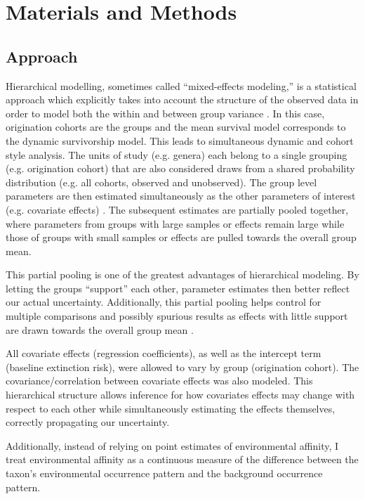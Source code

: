 \documentclass[12pt,letterpaper]{article}
\begin{document}
\section{Materials and Methods}

\subsection{Approach}

Hierarchical modelling, sometimes called ``mixed-effects modeling,'' is a statistical approach which explicitly takes into account the structure of the observed data in order to model both the within and between group variance \citep{Gelman2013d,Gelman2007}. In this case, origination cohorts are the groups and the mean survival model corresponds to the dynamic survivorship model. This leads to simultaneous dynamic and cohort style analysis. The units of study (e.g. genera) each belong to a single grouping (e.g. origination cohort) that are also considered draws from a shared probability distribution (e.g. all cohorts, observed and unobserved). The group level parameters are then estimated simultaneously as the other parameters of interest (e.g. covariate effects) \citep{Gelman2013d}. The subsequent estimates are partially pooled together, where parameters from groups with large samples or effects remain large while those of groups with small samples or effects are pulled towards the overall group mean. 

This partial pooling is one of the greatest advantages of hierarchical modeling. By letting the groups ``support'' each other, parameter estimates then better reflect our actual uncertainty. Additionally, this partial pooling helps control for multiple comparisons and possibly spurious results as effects with little support are drawn towards the overall group mean \citep{Gelman2013d,Gelman2007}. 

All covariate effects (regression coefficients), as well as the intercept term (baseline extinction risk), were allowed to vary by group (origination cohort). The covariance/correlation between covariate effects was also modeled. This hierarchical structure allows inference for how covariates effects may change with respect to each other while simultaneously estimating the effects themselves, correctly propagating our uncertainty. 

Additionally, instead of relying on point estimates of environmental affinity, I treat environmental affinity as a continuous measure of the difference between the taxon's environmental occurrence pattern and the background occurrence pattern.
\end{document}
